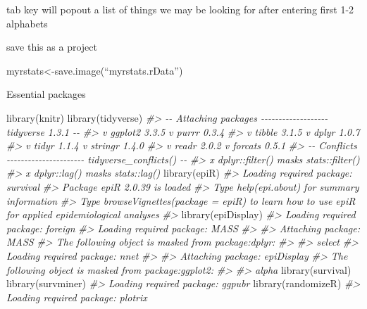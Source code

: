 \documentclass[
]{article}
\newenvironment{Shaded}{\begin{snugshade}}{\end{snugshade}}
\newcommand{\CommentTok}[1]{\textcolor[rgb]{0.56,0.35,0.01}{\textit{#1}}}
\newcommand{\FunctionTok}[1]{\textcolor[rgb]{0.00,0.00,0.00}{#1}}
\newcommand{\NormalTok}[1]{#1}
\begin{document}
tab key will popout a list of things we may be looking for after entering
first 1-2 alphabets

save this as a project

myrstats\textless-save.image(``myrstats.rData'')

Essential packages

\begin{Shaded}
\begin{Highlighting}[]
\FunctionTok{library}\NormalTok{(knitr)}
\FunctionTok{library}\NormalTok{(tidyverse)}
\CommentTok{\#\textgreater{} {-}{-} Attaching packages {-}{-}{-}{-}{-}{-}{-}{-}{-}{-}{-}{-}{-}{-}{-}{-}{-}{-}{-} tidyverse 1.3.1 {-}{-}}
\CommentTok{\#\textgreater{} v ggplot2 3.3.5     v purrr   0.3.4}
\CommentTok{\#\textgreater{} v tibble  3.1.5     v dplyr   1.0.7}
\CommentTok{\#\textgreater{} v tidyr   1.1.4     v stringr 1.4.0}
\CommentTok{\#\textgreater{} v readr   2.0.2     v forcats 0.5.1}
\CommentTok{\#\textgreater{} {-}{-} Conflicts {-}{-}{-}{-}{-}{-}{-}{-}{-}{-}{-}{-}{-}{-}{-}{-}{-}{-}{-}{-}{-}{-} tidyverse\_conflicts() {-}{-}}
\CommentTok{\#\textgreater{} x dplyr::filter() masks stats::filter()}
\CommentTok{\#\textgreater{} x dplyr::lag()    masks stats::lag()}
\FunctionTok{library}\NormalTok{(epiR)}
\CommentTok{\#\textgreater{} Loading required package: survival}
\CommentTok{\#\textgreater{} Package epiR 2.0.39 is loaded}
\CommentTok{\#\textgreater{} Type help(epi.about) for summary information}
\CommentTok{\#\textgreater{} Type browseVignettes(package = \textquotesingle{}epiR\textquotesingle{}) to learn how to use epiR for applied epidemiological analyses}
\CommentTok{\#\textgreater{} }
\FunctionTok{library}\NormalTok{(epiDisplay)}
\CommentTok{\#\textgreater{} Loading required package: foreign}
\CommentTok{\#\textgreater{} Loading required package: MASS}
\CommentTok{\#\textgreater{} }
\CommentTok{\#\textgreater{} Attaching package: \textquotesingle{}MASS\textquotesingle{}}
\CommentTok{\#\textgreater{} The following object is masked from \textquotesingle{}package:dplyr\textquotesingle{}:}
\CommentTok{\#\textgreater{} }
\CommentTok{\#\textgreater{}     select}
\CommentTok{\#\textgreater{} Loading required package: nnet}
\CommentTok{\#\textgreater{} }
\CommentTok{\#\textgreater{} Attaching package: \textquotesingle{}epiDisplay\textquotesingle{}}
\CommentTok{\#\textgreater{} The following object is masked from \textquotesingle{}package:ggplot2\textquotesingle{}:}
\CommentTok{\#\textgreater{} }
\CommentTok{\#\textgreater{}     alpha}
\FunctionTok{library}\NormalTok{(survival)}
\FunctionTok{library}\NormalTok{(survminer)}
\CommentTok{\#\textgreater{} Loading required package: ggpubr}
\FunctionTok{library}\NormalTok{(randomizeR)}
\CommentTok{\#\textgreater{} Loading required package: plotrix}
\end{Highlighting}
\end{Shaded}
\end{document}
